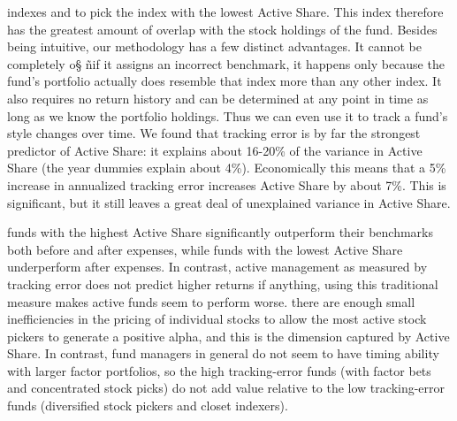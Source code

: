 \documentclass[12 pt]{article}
\begin{document}
indexes and to pick the index with the
lowest
Active Share. This index therefore has the
greatest amount of overlap with the stock holdings of the fund.
Besides being intuitive, our methodology has a few distinct advantages. It cannot be completely o§ ñif it assigns an incorrect benchmark, it happens only because the fund's portfolio actually does resemble that index more than any other index. It also requires no return history and can be determined at any point in time as long as we know the portfolio holdings. Thus we can even use it to track a fund's style changes over time. We found that tracking error is by far the strongest predictor of Active Share: it explains
about 16-20\% of the variance in Active Share (the year dummies explain about 4\%). Economically this means that a 5\% increase in annualized tracking error increases Active Share by about 7\%. This is significant, but it still leaves a great deal of unexplained variance in Active Share.
\par funds with the highest Active Share significantly outperform their benchmarks both before and after expenses, while funds with the lowest Active Share underperform after expenses. In contrast, active management as measured by tracking error does not predict higher returns if anything, using this traditional measure makes active funds seem to perform worse. there are enough small inefficiencies in the pricing of individual stocks to allow the most active stock pickers to generate a positive alpha, and this is the dimension captured by Active Share. In contrast, fund managers in general do not seem to have timing ability with larger factor portfolios, so the high tracking-error funds (with factor bets and concentrated stock picks) do not add value relative to the low tracking-error funds (diversified stock pickers and closet indexers).
\end{document}
